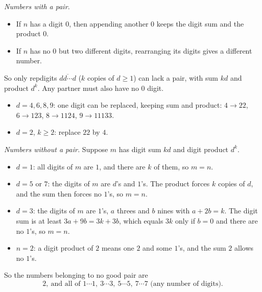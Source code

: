 \emph{Numbers with a pair.}
\begin{itemize}
\item If $n$ has a digit $0$, then appending another $0$ keeps the digit sum and the product $0$.
\item If $n$ has no $0$ but two different digits, rearranging its digits gives a different number.
\end{itemize}
So only repdigits $\overline{dd\cdots d}$ ($k$ copies of $d\ge1$) can lack a pair, with sum $kd$ and product $d^k$. Any partner must also have no $0$ digit.
\begin{itemize}
\item $d=4,6,8,9$: one digit can be replaced, keeping sum and product: $4\to22$, $6\to123$, $8\to1124$, $9\to11133$.
\item $d=2$, $k\ge2$: replace $22$ by $4$.
\end{itemize}

\emph{Numbers without a pair.} Suppose $m$ has digit sum $kd$ and digit product $d^k$.
\begin{itemize}
\item $d=1$: all digits of $m$ are $1$, and there are $k$ of them, so $m=n$.
\item $d=5$ or $7$: the digits of $m$ are $d$'s and $1$'s. The product forces $k$ copies of $d$, and the sum then forces no $1$'s, so $m=n$.
\item $d=3$: the digits of $m$ are $1$'s, $a$ threes and $b$ nines with $a+2b=k$. The digit sum is at least $3a+9b=3k+3b$, which equals $3k$ only if $b=0$ and there are no $1$'s, so $m=n$.
\item $n=2$: a digit product of $2$ means one $2$ and some $1$'s, and the sum $2$ allows no $1$'s.
\end{itemize}

So the numbers belonging to no good pair are
\[\boxed{2,\ \text{and all of }1\cdots1,\ 3\cdots3,\ 5\cdots5,\ 7\cdots7\text{ (any number of digits)}}.\]
